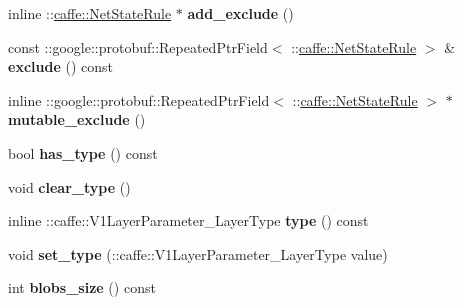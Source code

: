 \begin{DoxyCompactItemize}
\item 
\mbox{\label{classcaffe_1_1_v1_layer_parameter_a7710ba666032682b0ebe23c35cf2a3d1}} 
inline \+::\mbox{\hyperlink{classcaffe_1_1_net_state_rule}{caffe\+::\+Net\+State\+Rule}} $\ast$ {\bfseries add\+\_\+exclude} ()
\item 
\mbox{\label{classcaffe_1_1_v1_layer_parameter_a897c6f5095c19f31e0e48da365be6990}} 
const \+::google\+::protobuf\+::\+Repeated\+Ptr\+Field$<$ \+::\mbox{\hyperlink{classcaffe_1_1_net_state_rule}{caffe\+::\+Net\+State\+Rule}} $>$ \& {\bfseries exclude} () const
\item 
\mbox{\label{classcaffe_1_1_v1_layer_parameter_a7ff4b3dc2e7fc6c650e313e76d20bc56}} 
inline \+::google\+::protobuf\+::\+Repeated\+Ptr\+Field$<$ \+::\mbox{\hyperlink{classcaffe_1_1_net_state_rule}{caffe\+::\+Net\+State\+Rule}} $>$ $\ast$ {\bfseries mutable\+\_\+exclude} ()
\item 
\mbox{\label{classcaffe_1_1_v1_layer_parameter_abab5a930abe01bd1620b6d9563433f31}} 
bool {\bfseries has\+\_\+type} () const
\item 
\mbox{\label{classcaffe_1_1_v1_layer_parameter_a59877db4cfa69e445769672de44b9446}} 
void {\bfseries clear\+\_\+type} ()
\item 
\mbox{\label{classcaffe_1_1_v1_layer_parameter_a1a0080d9dea450ee8b593dd2255c71cc}} 
inline \+::caffe\+::\+V1\+Layer\+Parameter\+\_\+\+Layer\+Type {\bfseries type} () const
\item 
\mbox{\label{classcaffe_1_1_v1_layer_parameter_a4f1dfb7a4f8b0bcef552df6ae09fce48}} 
void {\bfseries set\+\_\+type} (\+::caffe\+::\+V1\+Layer\+Parameter\+\_\+\+Layer\+Type value)
\item 
\mbox{\label{classcaffe_1_1_v1_layer_parameter_aaccfd4a7e924085a3c19671d39fca47a}} 
int {\bfseries blobs\+\_\+size} () const
\item 
\mbox{\label{classcaffe_1_1_v1_layer_parameter_a9e478a67ab11b0599bd9e36d03b0ac06}} 

\end{DoxyCompactItemize}
